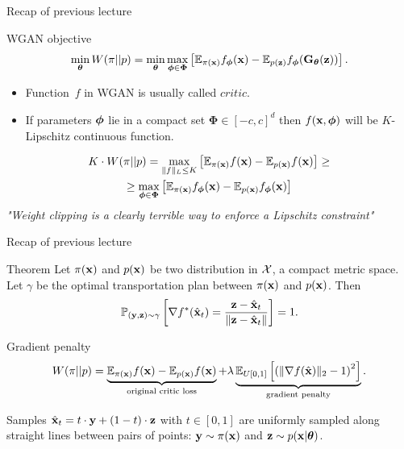 \begin{frame}{Recap of previous lecture}
	\begin{block}{WGAN objective}
		\vspace{-0.3cm}
		\[
		\min_{\boldsymbol{\theta}} W(\pi || p) = \min_{\boldsymbol{\theta}} \max_{\boldsymbol{\phi} \in \boldsymbol{\Phi}} \left[ \mathbb{E}_{\pi(\mathbf{x})} f_{\boldsymbol{\phi}}(\mathbf{x})  - \mathbb{E}_{p(\mathbf{z})} f_{\boldsymbol{\phi}}(\mathbf{G}_{\boldsymbol{\theta}}(\mathbf{z}))\right].
		\]
		\vspace{-0.3cm}
	\end{block}
	\begin{itemize}
		\item Function~$f$ in WGAN is usually called $\textit{critic}$.
		\item If parameters $\boldsymbol{\phi}$ lie in a compact set $\boldsymbol{\Phi} \in [-c, c]^d$ then $f(\mathbf{x}, \boldsymbol{\phi})$ will be $K$-Lipschitz continuous function. 
	\end{itemize}
	\begin{multline*}
		K \cdot W(\pi || p) = \max_{\| f \|_L \leq K} \left[ \mathbb{E}_{\pi(\mathbf{x})} f(\mathbf{x})  - \mathbb{E}_{p(\mathbf{x})} f(\mathbf{x})\right] \geq \\  \geq \max_{\boldsymbol{\phi} \in \boldsymbol{\Phi}} \left[ \mathbb{E}_{\pi(\mathbf{x})} f_{\boldsymbol{\phi}}(\mathbf{x})  - \mathbb{E}_{p(\mathbf{x})} f_{\boldsymbol{\phi}}(\mathbf{x})\right]
	\end{multline*}
	\textit{"Weight clipping is a clearly terrible way to enforce a Lipschitz constraint"}
\end{frame}
\begin{frame}{Recap of previous lecture}
	\begin{block}{Theorem}
		Let $\pi(\mathbf{x})$ and $p(\mathbf{x})$ be two distribution in $\mathcal{X}$, a compact metric space. Let $\gamma$ be the optimal transportation plan between $\pi(\mathbf{x})$ and $p(\mathbf{x})$. Then
		\vspace{-0.4cm}
		\[
			\mathbb{P}_{(\mathbf{y}, \mathbf{z}) \sim \gamma} \left[ \nabla f^*(\hat{\mathbf{x}}_t) = \frac{\mathbf{z} - \hat{\mathbf{x}}_t}{\| \mathbf{z} - \hat{\mathbf{x}}_t \|} \right] = 1.
		\]
		\vspace{-0.6cm}
	\end{block}
	\begin{block}{Gradient penalty}
		\vspace{-0.5cm}
		\[
			W(\pi || p) = \underbrace{\mathbb{E}_{\pi(\mathbf{x})} f(\mathbf{x})  - \mathbb{E}_{p(\mathbf{x})} f(\mathbf{x})}_{\text{original critic loss}} + \lambda \underbrace{\mathbb{E}_{U[0, 1]} \left[ \left( \| \nabla f(\hat{\mathbf{x}}) \|_2 - 1 \right) ^ 2\right]}_{\text{gradient penalty}}.
		\]
		\vspace{-0.5cm}
	\end{block}
	Samples $\hat{\mathbf{x}}_t = t \cdot \mathbf{y} + (1 - t) \cdot \mathbf{z}$ with $t \in [0, 1]$ are uniformly sampled along straight lines between pairs of points: $\mathbf{y} \sim \pi(\mathbf{x})$ and $\mathbf{z} \sim p(\mathbf{x} | \boldsymbol{\theta})$.
\end{frame}
